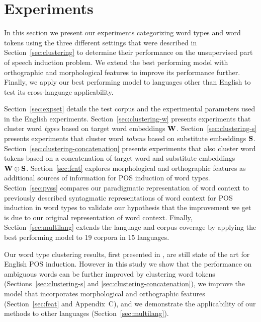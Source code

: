 \section{Experiments}
\label{sec:exp}


In this section we present our experiments categorizing word types and
word tokens using the three different settings that were described in
Section~\ref{sec:clustering} to determine their performance on the
unsupervised part of speech induction problem.  We extend the best
performing model with orthographic and morphological features to
improve its performance further.  Finally, we apply our best
performing model to languages other than English to test its
cross-language applicability.

Section~\ref{sec:expset} details the test corpus and the experimental
parameters used in the English experiments.
Section~\ref{sec:clustering-w} presents experiments that cluster word
{\em types} based on target word embeddings ${\bf W}$.
Section~\ref{sec:clustering-s} presents experiments that cluster word
{\em tokens} based on substitute embeddings ${\bf S}$.
Section~\ref{sec:clustering-concatenation} presents experiments that
also cluster word tokens based on a concatenation of target word and
substitute embeddings ${\bf W}\oplus{\bf S}$.  Section~\ref{sec:feat}
explores morphological and orthographic features as additional sources
of information for POS induction of word types.  Section~\ref{sec:pvss} compares our paradigmatic
representation of word context to previously described syntagmatic
representations of word context for POS induction in word types to
validate our hypothesis that the improvement we get is due to our
original representation of word context.  Finally,
Section~\ref{sec:multilang} extends the language and corpus coverage
by applying the best performing model to 19 corpora in 15 languages.

Our word type clustering results, first presented in
\cite{yatbaz-sert-yuret:2012:EMNLP-CoNLL}, are still state of the art
for English POS induction.  However in this study we show that the
performance on ambiguous words can be further improved by clustering
word tokens (Sections~\ref{sec:clustering-s} and
\ref{sec:clustering-concatenation}), we improve the model that
incorporates morphological and orthographic features
(Section~\ref{sec:feat} and Appendix~C), and we demonstrate the
applicability of our methods to other languages
(Section~\ref{sec:multilang}).

